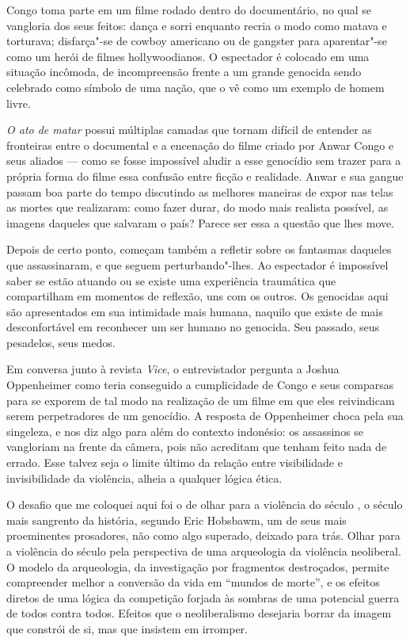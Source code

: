 Congo toma parte em um filme rodado dentro do documentário, no qual se
vangloria dos seus feitos: dança e sorri enquanto recria o modo como
matava e torturava; disfarça"-se de cowboy americano ou de gangster para
aparentar"-se como um herói de filmes hollywoodianos. O espectador é
colocado em uma situação incômoda, de incompreensão frente a um grande
genocida sendo celebrado como símbolo de uma nação, que o vê como um
exemplo de homem livre.

\emph{O ato de matar} possui múltiplas camadas que tornam difícil de
entender as fronteiras entre o documental e a encenação do filme criado
por Anwar Congo e seus aliados --- como se fosse impossível aludir a
esse genocídio sem trazer para a própria forma do filme essa confusão
entre ficção e realidade. Anwar e sua gangue passam boa parte do tempo
discutindo as melhores maneiras de expor nas telas as mortes que
realizaram: como fazer durar, do modo mais realista possível, as imagens
daqueles que salvaram o país? Parece ser essa a questão que lhes move.

Depois de certo ponto, começam também a refletir sobre os fantasmas
daqueles que assassinaram, e que seguem perturbando"-lhes. Ao espectador
é impossível saber se estão atuando ou se existe uma experiência
traumática que compartilham em momentos de reflexão, uns com os outros.
Os genocidas aqui são apresentados em sua intimidade mais humana,
naquilo que existe de mais desconfortável em reconhecer um ser humano no
genocida. Seu passado, seus pesadelos, seus medos.

\asterisc

Em conversa junto à revista \emph{Vice}, o entrevistador pergunta a Joshua
Oppenheimer como teria conseguido a cumplicidade de Congo e seus
comparsas para se exporem de tal modo na realização de um filme em que
eles reivindicam serem perpetradores de um genocídio. A resposta de
Oppenheimer choca pela sua singeleza, e nos diz algo para além do
contexto indonésio: os assassinos se vangloriam na frente da câmera,
pois não acreditam que tenham feito nada de errado. Esse talvez seja o
limite último da relação entre visibilidade e invisibilidade da
violência, alheia a qualquer lógica ética.

\asterisc

O desafio que me coloquei aqui foi o de olhar para a violência do século , o século mais sangrento
da história, segundo Eric Hobsbawm, um de seus mais proeminentes
prosadores, não como algo superado, deixado para trás. Olhar para a
violência do século  pela perspectiva de uma arqueologia da violência
neoliberal. O modelo da arqueologia, da investigação por fragmentos
destroçados, permite compreender melhor a conversão da vida em ``mundos
de morte'', e os efeitos diretos de uma lógica da competição forjada às
sombras de uma potencial guerra de todos contra todos. Efeitos que o neoliberalismo
desejaria borrar da imagem que constrói de
si, mas que insistem em irromper.

